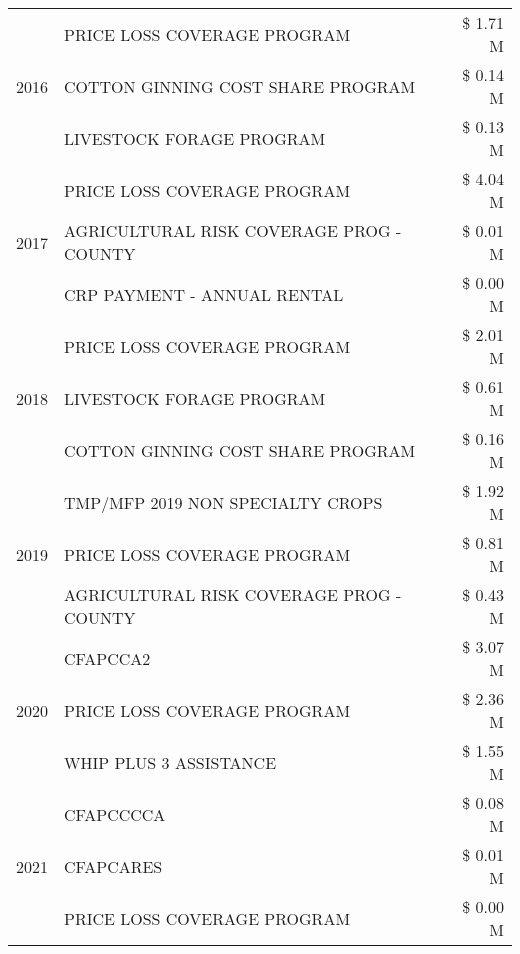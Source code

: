 \begin{tabular}{llr}
\cline{1-3}
\multirow[t]{3}{*}{2016} & PRICE LOSS COVERAGE PROGRAM & \$ 1.71 M \\
 & COTTON GINNING COST SHARE PROGRAM & \$ 0.14 M \\
 & LIVESTOCK FORAGE PROGRAM & \$ 0.13 M \\
\cline{1-3}
\multirow[t]{3}{*}{2017} & PRICE LOSS COVERAGE PROGRAM & \$ 4.04 M \\
 & AGRICULTURAL RISK COVERAGE PROG - COUNTY & \$ 0.01 M \\
 & CRP PAYMENT - ANNUAL RENTAL & \$ 0.00 M \\
\cline{1-3}
\multirow[t]{3}{*}{2018} & PRICE LOSS COVERAGE PROGRAM & \$ 2.01 M \\
 & LIVESTOCK FORAGE PROGRAM & \$ 0.61 M \\
 & COTTON GINNING COST SHARE PROGRAM & \$ 0.16 M \\
\cline{1-3}
\multirow[t]{3}{*}{2019} & TMP/MFP 2019 NON SPECIALTY CROPS & \$ 1.92 M \\
 & PRICE LOSS COVERAGE PROGRAM & \$ 0.81 M \\
 & AGRICULTURAL RISK COVERAGE PROG - COUNTY & \$ 0.43 M \\
\cline{1-3}
\multirow[t]{3}{*}{2020} & CFAPCCA2 & \$ 3.07 M \\
 & PRICE LOSS COVERAGE PROGRAM & \$ 2.36 M \\
 & WHIP PLUS 3 ASSISTANCE & \$ 1.55 M \\
\cline{1-3}
\multirow[t]{3}{*}{2021} & CFAPCCCCA & \$ 0.08 M \\
 & CFAPCARES & \$ 0.01 M \\
 & PRICE LOSS COVERAGE PROGRAM & \$ 0.00 M \\
\cline{1-3}
\bottomrule
\end{tabular}
